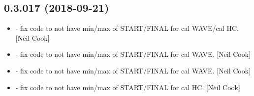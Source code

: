 \documentclass[a4paper,10pt,english]{report}
\begin{document}
\subsection{0.3.017 (2018-09-21)}
\label{\detokenize{misc/changelog:id315}}\begin{itemize}
\item {} 
 - fix code to not have min/max of 
START/FINAL for cal WAVE/cal HC. {[}Neil Cook{]}

\item {} 
 - fix code to not have min/max of 
START/FINAL for cal WAVE. {[}Neil Cook{]}

\item {} 
 - fix code to not have min/max of
 START/FINAL for cal WAVE. {[}Neil Cook{]}

\item {} 
 - fix code to not have min/max of 
START/FINAL for cal HC. {[}Neil Cook{]}

\end{itemize}
\end{document}
